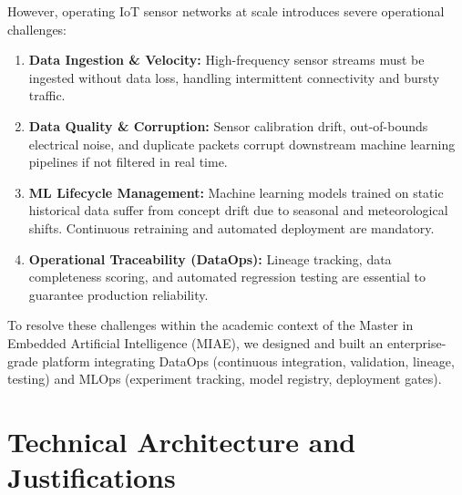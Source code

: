 \documentclass[12pt,a4paper]{article}
\begin{document}
However, operating IoT sensor networks at scale introduces severe operational challenges:
\begin{enumerate}
    \item \textbf{Data Ingestion \& Velocity:} High-frequency sensor streams must be ingested without data loss, handling intermittent connectivity and bursty traffic.
    \item \textbf{Data Quality \& Corruption:} Sensor calibration drift, out-of-bounds electrical noise, and duplicate packets corrupt downstream machine learning pipelines if not filtered in real time.
    \item \textbf{ML Lifecycle Management:} Machine learning models trained on static historical data suffer from concept drift due to seasonal and meteorological shifts. Continuous retraining and automated deployment are mandatory.
    \item \textbf{Operational Traceability (DataOps):} Lineage tracking, data completeness scoring, and automated regression testing are essential to guarantee production reliability.
\end{enumerate}

To resolve these challenges within the academic context of the Master in Embedded Artificial Intelligence (MIAE), we designed and built an enterprise-grade platform integrating DataOps (continuous integration, validation, lineage, testing) and MLOps (experiment tracking, model registry, deployment gates).

\section{Technical Architecture and Justifications}
\end{document}
